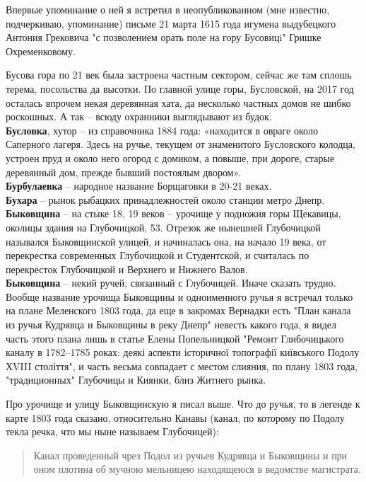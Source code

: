 Впервые упоминание о ней я встретил в неопубликованном (мне известно, подчеркиваю, упоминание) письме 21 марта 1615 года игумена выдубецкого Антония Грековича "с позволением орать поле на гору Бусовицi" Гришке Охременковому.

Бусова гора по 21 век была застроена частным сектором, сейчас же там сплошь терема, посольства да высотки. По главной улице горы, Бусловской, на 2017 год осталась впрочем некая деревянная хата, да несколько частных домов не шибко роскошных. А так – всюду охранники выглядывают из будок.\\ 

\textbf{Бусловка}, хутор – из справочника 1884 года: «находится в овраге около Саперного лагеря. Здесь на ручье, текущем от знаменитого Бусловского колодца, устроен пруд и около него огород с домиком, а повыше, при дороге, старые деревянный дом, прежде бывший постоялым двором».\\

\textbf{Бурбулаевка} – народное название Борщаговки в 20-21 веках.\\

\textbf{Бухара} – рынок рыбацких принадлежностей около станции метро Днепр.\\

\textbf{Быковщина} – на стыке 18, 19 веков – урочище у подножия горы Щекавицы, околицы здания на Глубочицкой, 53. Отрезок же нынешней Глубочицкой назывался Быковщинской улицей, и начиналась она, на начало 19 века, от перекрестка современных Глубочицкой и Студентской, и считалась по перекресток Глубочицкой и Верхнего и Нижнего Валов.\\

\textbf{Быковщина} – некий ручей, связанный с Глубочицей. Иначе сказать трудно. Вообще название урочища Быковщины и одноименного ручья я встречал только на плане Меленского 1803 года, да еще в закромах Вернадки есть "План канала из ручья Кудрявца и Быковщины в реку Днепр" невесть какого года, я видел часть этого плана лишь в статье Елены Попельницкой "Ремонт Глибочицького каналу в 1782–1785 роках:
деякі аспекти історичної топографії київського Подолу ХVIII століття", и часть весьма совпадает с местом слияния, по плану 1803 года, "традиционных" Глубочицы и Киянки, близ Житнего рынка.

Про урочище и улицу Быковщинскую я писал выше. Что до ручья, то в легенде к карте 1803 года сказано, относительно Канавы (канал, по которому по Подолу текла речка, что мы ныне называем Глубочицей):

\begin{quotation}
Канал проведенный чрез Подол из ручьев Кудрявца и Быковщины и при оном плотина об мучною мельницею находящеюся в ведомстве магистрата.
\end{quotation}

